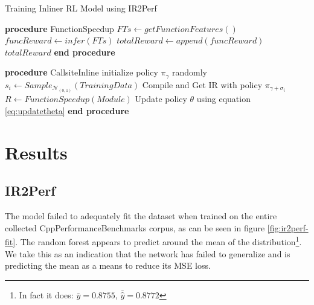 \documentclass[nohyperref]{article}
\theoremstyle{plain}
\theoremstyle{definition}
\theoremstyle{remark}
\begin{document}
\begin{algorithm}
    \caption{Training Inliner RL Model using IR2Perf}
    \label{alg:mlgo}
\begin{algorithmic}
    \STATE \textbf{procedure} FunctionSpeedup
       \STATE $FTs \leftarrow getFunctionFeatures()$
       \STATE $funcReward \leftarrow infer(FTs)$
       \STATE $totalReward \leftarrow append(funcReward)$
       \ENDFOR
       \RETURN $totalReward$
    \STATE \textbf{end procedure}
\end{algorithmic}
\;
\;
\begin{algorithmic}
    \STATE \textbf{procedure} CallsiteInline
        \STATE initialize policy $\pi_{\gamma}$ randomly
        \STATE $s_i \leftarrow Sample_{\mathcal{N}_{(0,1)}}(TrainingData)$
        \STATE Compile and Get IR with policy $\pi_{\gamma + \sigma_i}$
        \STATE $R \leftarrow FunctionSpeedup(Module)$
        \STATE Update policy $\theta$ using equation \ref{eq:updatetheta}
        \ENDFOR
    \STATE \textbf{end procedure}
\end{algorithmic}
\end{algorithm}

\section{Results}
\label{results}
\subsection{IR2Perf}
The model failed to adequately fit the dataset when trained on the entire collected CppPerformanceBenchmarks corpus, as can be seen in figure \ref{fig:ir2perf-fit}. The random forest appears to predict around the mean of the distribution\footnote{In fact it does: $\bar{y} = 0.8755$, $\bar{\hat{y}} = 0.8772$}. We take this as an indication that the network has failed to generalize and is predicting the mean as a means to reduce its MSE loss.
\end{document}

